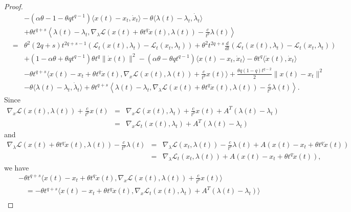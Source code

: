 \documentclass[review]{elsarticle}
\begin{document}
\begin{proof}
\begin{eqnarray}
			&&-(\alpha\theta-1-\theta q t^{q-1})\langle x(t)-x_t, \dot{x}_t\rangle-\theta\langle \lambda(t)-\lambda_t, \dot{\lambda}_t \rangle\nonumber\\
			&&+\theta t^{q+s}\left\langle \lambda(t)-\lambda_t, \nabla_{\lambda}\mathcal{L}(x(t)+\theta t^q\dot{x}(t), \lambda(t))-\frac{c}{t^p}\lambda(t)\right\rangle\nonumber\\
			&=&\theta^2(2q+s) t^{2q+s-1}\left(\mathcal{L}_{t}(x(t),\lambda_t)-\mathcal{L}_{t}(x_t,\lambda_t)\right)+\theta^2t^{2q+s}\frac{d}{dt}\left(\mathcal{L}_{t}(x(t),\lambda_t)-\mathcal{L}_{t}(x_t,\lambda_t)\right)\nonumber\\
			&&+(1-\alpha\theta+\theta qt^{q-1})\theta t^q\|\dot{x}(t)\|^2-(\alpha\theta-\theta q t^{q-1})\langle x(t)-x_t, \dot{x}_t\rangle-\theta t^q\langle\dot{x}(t), \dot{x}_t\rangle\nonumber\\
			&&-\theta t^{q+s}\langle x(t)-x_t+\theta t^q\dot{x}(t), \nabla_{x}\mathcal{L}(x(t), \lambda(t))+\frac{c}{t^p}x(t)\rangle+\frac{\theta q(1-q)t^{q-2}}{2}\|x(t)-x_t\|^2\nonumber\\
			&&-\theta\langle \lambda(t)-\lambda_t, \dot{\lambda}_t\rangle+\theta t^{q+s}\left\langle \lambda(t)-\lambda_t, \nabla_{\lambda}\mathcal{L}(x(t)+\theta t^q\dot{x}(t), \lambda(t))-\frac{c}{t^p}\lambda(t)\right\rangle.
		\end{eqnarray}
Since
		\begin{eqnarray*}
			\nabla_{x}\mathcal{L}(x(t), \lambda(t))+\frac{c}{t^p}x(t)&=&\nabla_{x}\mathcal{L}(x(t), \lambda_t)+\frac{c}{t^p}x(t)+A^T(\lambda(t)-\lambda_t)\\
			&=&\nabla_{x}\mathcal{L}_{t}(x(t), \lambda_t)+A^T(\lambda(t)-\lambda_t)
		\end{eqnarray*}
		and 
		\begin{eqnarray*}
			\nabla_{\lambda}\mathcal{L}(x(t)+\theta t^q\dot{x}(t), \lambda(t))-\frac{c}{t^p}\lambda(t)&=&\nabla_{\lambda}\mathcal{L}(x_t, \lambda(t))-\frac{c}{t^p}\lambda(t)+A\left(x(t)-x_t+\theta t^q\dot{x}(t)\right)\\
			&=&\nabla_{\lambda}\mathcal{L}_{t}(x_t, \lambda(t))+A\left(x(t)-x_t+\theta t^q\dot{x}(t)\right),
		\end{eqnarray*}
we have 
		\begin{eqnarray*}
			&&-\theta t^{q+s}\langle x(t)-x_t+\theta t^q\dot{x}(t), \nabla_{x}\mathcal{L}(x(t), \lambda(t))+\frac{c}{t^p}x(t)\rangle\\
			&&\quad=-\theta t^{q+s}\langle x(t)-x_t+\theta t^q\dot{x}(t), \nabla_{x}\mathcal{L}_{t}(x(t), \lambda_t)+A^T(\lambda(t)-\lambda_t)\rangle\\

\end{eqnarray*}
\end{proof}
\end{document}
